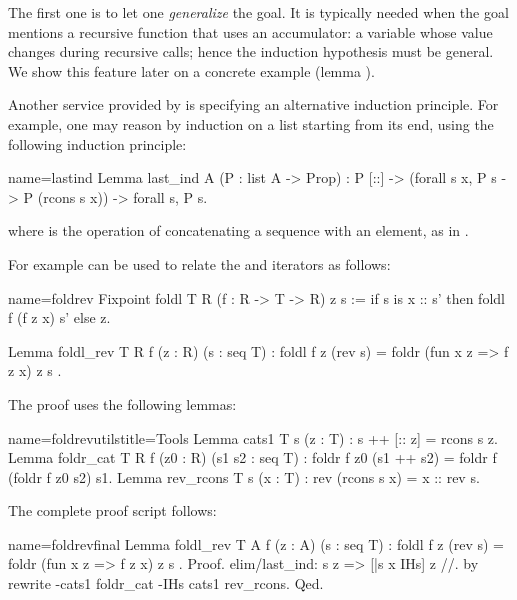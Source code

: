The first one is to let one \emph{generalize}
the goal.  It is typically needed when the goal mentions a recursive function
that uses an accumulator: a variable whose value changes during recursive calls;
hence the induction hypothesis must be general.  We show
this feature later on a concrete example (lemma ).

Another service provided by  is specifying an alternative
induction principle. For example, one may reason by induction on
a list starting from its end, using the following induction principle:

\begin{coq}{name=lastind}{}
Lemma last_ind A (P : list A -> Prop) :
  P [::] -> (forall s x, P s -> P (rcons s x)) -> forall s, P s.
\end{coq}
where  is the operation of concatenating
a sequence with an element, as in .

For example  can be used to relate the
 and  iterators as follows:

\begin{coq}{name=foldrev}{}
Fixpoint foldl T R (f : R -> T -> R) z s :=
  if s is x :: s' then foldl f (f z x) s' else z.

Lemma foldl_rev T R f (z : R) (s : seq T) :
  foldl f z (rev s) = foldr (fun x z => f z x) z s .
\end{coq}

The proof uses the following lemmas:

\begin{coq}{name=foldrevutils}{title=Tools}
Lemma cats1 T s (z : T) : s ++ [:: z] = rcons s z.
Lemma foldr_cat T R f (z0 : R) (s1 s2 : seq T) :
  foldr f z0 (s1 ++ s2) = foldr f (foldr f z0 s2) s1.
Lemma rev_rcons T s (x : T) : rev (rcons s x) = x :: rev s.
\end{coq}

The complete proof script follows:

\begin{coq}{name=foldrevfinal}{}
Lemma foldl_rev T A f (z : A) (s : seq T) :
  foldl f z (rev s) = foldr (fun x z => f z x) z s .
Proof.
elim/last_ind: s z => [|s x IHs] z //.
by rewrite -cats1 foldr_cat -IHs cats1 rev_rcons.
Qed.
\end{coq}

